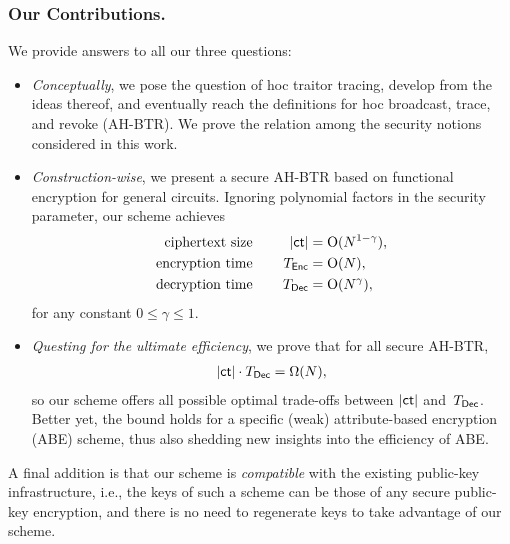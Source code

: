 \subsubsection{Our Contributions.}
We provide answers to all our three questions:
\begin{itemize}
\item \emph{Conceptually}, we pose the question of \ad hoc traitor tracing,
develop from the ideas thereof, and
eventually reach the definitions for \ad hoc broadcast, trace, and revoke (AH-BTR).
We prove the relation among the security notions considered in this work.
\item \emph{Construction-wise},
we present a secure AH-BTR based on functional encryption for general circuits.
Ignoring polynomial factors in the security parameter,
our scheme achieves
\begin{align*}
\textup{ciphertext size}\qquad\qquad\mathllap{|\ct|}&{}=\bigO(N^{1-\gamma}),\\
\textup{encryption time}\qquad\qquad\mathllap{T_\Enc}&{}=\bigO(N),\\
\textup{decryption time}\qquad\qquad\mathllap{T_\Dec}&{}=\bigO(N^\gamma),
\end{align*}
for any constant ${0\leq\gamma\leq 1}$.
\item \emph{Questing for the ultimate efficiency},
we prove that for all secure AH-BTR,
\begin{align*}
|\ct|\cdot\TDec=\Omega(N),
\end{align*}
so our scheme offers all possible optimal trade-offs between $|\ct|$ and~$\TDec$.
Better yet, the bound holds for a specific (weak) attribute-based encryption (ABE) scheme, thus also shedding new insights into the efficiency of ABE.
\end{itemize}
A final addition is that our scheme is \emph{compatible} with the existing public-key infrastructure,
i.e., the keys of such a scheme can be those of any secure public-key encryption, and
there is no need to regenerate keys to take advantage of our scheme.
